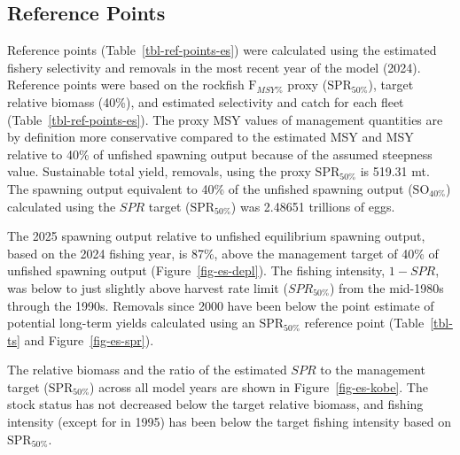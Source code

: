 \documentclass[
  english,
]{article}
\begin{document}
\subsection*{Reference Points}\label{reference-points}

Reference points (Table~\ref{tbl-ref-points-es}) were calculated using
the estimated fishery selectivity and removals in the most recent year
of the model (2024). Reference points were based on the rockfish
\(\text{F}_{MSY\%}\) proxy (\(\text{SPR}_{50\%}\)), target relative
biomass (40\%), and estimated selectivity and catch for each fleet
(Table~\ref{tbl-ref-points-es}). The proxy MSY values of management
quantities are by definition more conservative compared to the estimated
MSY and MSY relative to 40\% of unfished spawning output because of the
assumed steepness value. Sustainable total yield, removals, using the
proxy \(\text{SPR}_{50\%}\) is 519.31 mt. The spawning output equivalent
to 40\% of the unfished spawning output (\(\text{SO}_{40\%}\))
calculated using the \(SPR\) target (\(\text{SPR}_{50\%}\)) was 2.48651
trillions of eggs.

The 2025 spawning output relative to unfished equilibrium spawning
output, based on the 2024 fishing year, is 87\%, above the management
target of 40\% of unfished spawning output (Figure~\ref{fig-es-depl}).
The fishing intensity, \(1-SPR\), was below to just slightly above
harvest rate limit (\(SPR_{50\%}\)) from the mid-1980s through the
1990s. Removals since 2000 have been below the point estimate of
potential long-term yields calculated using an \(\text{SPR}_{50\%}\)
reference point (Table~\ref{tbl-ts} and Figure~\ref{fig-es-spr}).

The relative biomass and the ratio of the estimated \(SPR\) to the
management target (\(\text{SPR}_{50\%}\)) across all model years are
shown in Figure~\ref{fig-es-kobe}. The stock status has not decreased
below the target relative biomass, and fishing intensity (except for in
1995) has been below the target fishing intensity based on
\(\text{SPR}_{50\%}\).

\begingroup
\fontsize{9.0pt}{11.0pt}\selectfont
\end{document}
